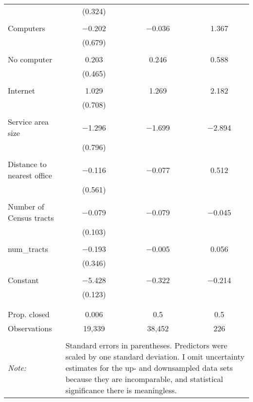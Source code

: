 \begin{table}[!htbp]
\begin{tabular}{@{\extracolsep{5pt}}lccc}
  & (0.324) &  &  \\ 
  & & & \\ 
 Computers & $-$0.202 & $-$0.036 & 1.367 \\ 
  & (0.679) &  &  \\ 
  & & & \\ 
 No computer & 0.203 & 0.246 & 0.588 \\ 
  & (0.465) &  &  \\ 
  & & & \\ 
 Internet & 1.029 & 1.269 & 2.182 \\ 
  & (0.708) &  &  \\ 
  & & & \\ 
 Service area size & $-$1.296 & $-$1.699 & $-$2.894 \\ 
  & (0.796) &  &  \\ 
  & & & \\ 
 Distance to nearest office & $-$0.116 & $-$0.077 & 0.512 \\ 
  & (0.561) &  &  \\ 
  & & & \\ 
 Number of Census tracts & $-$0.079 & $-$0.079 & $-$0.045 \\ 
  & (0.103) &  &  \\ 
  & & & \\ 
 num\_tracts & $-$0.193 & $-$0.005 & 0.056 \\ 
  & (0.346) &  &  \\ 
  & & & \\ 
 Constant & $-$5.428 & $-$0.322 & $-$0.214 \\ 
  & (0.123) &  &  \\ 
  & & & \\ 
\hline \\[-1.8ex] 
Prop. closed & 0.006 & 0.5 & 0.5 \\ 
Observations & 19,339 & 38,452 & 226 \\ 
\hline 
\hline \\[-1.8ex] 
\textit{Note:}  & \multicolumn{3}{l}{Standard errors in parentheses. Predictors were scaled by one standard deviation. I omit uncertainty estimates for the up- and downsampled data sets because they are incomparable, and statistical significance there is meaningless.} \\ 
\end{tabular} 
\end{table} 
